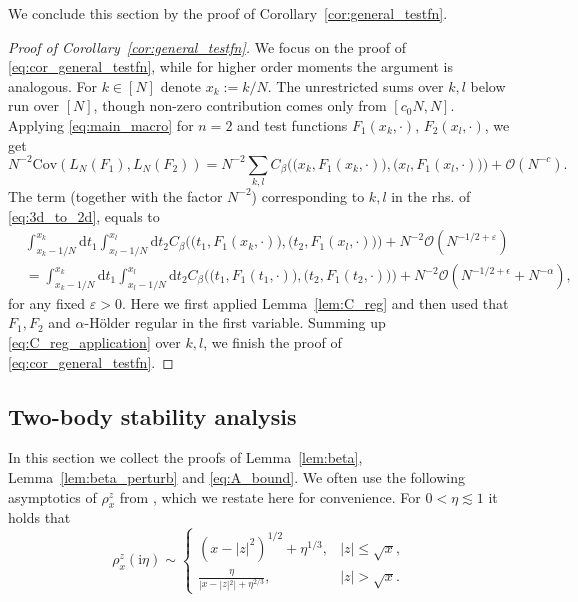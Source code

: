 \documentclass[10pt]{amsart}
\numberwithin{equation}{section}
\newcommand{\dif}{\mathrm{d}}
\newcommand{\Cov}{\mathrm{Cov}}
\newcommand{\ii}{\mathrm{i}}
\begin{document}
We conclude this section by the proof of Corollary~\ref{cor:general_testfn}.

\begin{proof}[Proof of Corollary~\ref{cor:general_testfn}] We focus on the proof of \eqref{eq:cor_general_testfn}, while for higher order moments the argument is analogous. For $k\in[N]$ denote $x_k:=k/N$. The unrestricted sums over $k, l$ below run over $[N]$, though non-zero contribution comes only from $[c_0N,N]$. Applying \eqref{eq:main_macro} for $n=2$ and test functions $F_1(x_{k},\cdot)$, $F_2(x_{l},\cdot)$, we get
\begin{equation}
N^{-2}\Cov\left(L_N(F_1),L_N(F_2)\right) = N^{-2}\sum_{k,l} C_\beta \Big(\big(x_{k}, F_1(x_{k},\cdot)\big),\big(x_{l}, F_1(x_{l},\cdot)\big)\Big) + \mathcal{O}(N^{-c}).
\label{eq:3d_to_2d}
\end{equation}
The term (together with the factor $N^{-2}$) corresponding to $k,l$ in the rhs. of \eqref{eq:3d_to_2d}, equals to
\begin{equation}
\begin{split}
&\int_{x_k-1/N}^{x_k}\!\!\!\dif t_1\int_{x_l-1/N}^{x_l}\!\!\!\dif t_2  C_\beta \Big(\big(t_1, F_1(x_k,\cdot)\big),\big(t_2, F_1(x_l,\cdot)\big)\Big)+N^{-2}\mathcal{O}\left(N^{-1/2+\varepsilon}\right)\\
&=\int_{x_k-1/N}^{x_k}\!\!\!\dif t_1\int_{x_l-1/N}^{x_l}\!\!\!\dif t_2  C_\beta \Big(\big(t_1, F_1(t_1,\cdot)\big),\big(t_2, F_1(t_2,\cdot)\big)\Big)+N^{-2}\mathcal{O}\left(N^{-1/2+\epsilon}+N^{-\alpha}\right),
\end{split}
\label{eq:C_reg_application}
\end{equation}
for any fixed $\varepsilon>0$. Here we first applied Lemma~\ref{lem:C_reg} and then used that $F_1,F_2$ and $\alpha$-H{\"o}lder regular in the first variable. Summing up \eqref{eq:C_reg_application} over $k,l$, we finish the proof of \eqref{eq:cor_general_testfn}.

\end{proof}


\subsection{Two-body stability analysis}\label{sec:beta} In this section we collect the proofs of Lemma~\ref{lem:beta}, Lemma~\ref{lem:beta_perturb} and \eqref{eq:A_bound}. We often use the following asymptotics of $\rho_x^z$ from \cite[Eq.(3.15)]{spectral_radius}, which we restate here for convenience. For $0<\eta\lesssim 1$ it holds that 
\begin{equation}
\rho^z_x(\ii\eta)\sim \begin{cases}
(x-|z|^2)^{1/2}+\eta^{1/3},&|z|\le\sqrt{x},\\
\frac{\eta}{|x-|z|^2| + \eta^{2/3}},&|z|>\sqrt{x}. 
\end{cases}
\label{eq:rho_asymp}
\end{equation}
\end{document}
